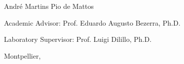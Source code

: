 \begin{titlepage}
    \vfill
    \vfill

    \begin{center}
        \large{André Martins Pio de Mattos}
    \end{center}

    \begin{center}
    
        Academic Advisor: Prof. Eduardo Augusto Bezerra, Ph.D.
        
        Laboratory Supervisor: Prof. Luigi Dilillo, Ph.D.
    
    \end{center}

    \vspace{1cm}

    \begin{center}
        Montpellier, \the\year
    \end{center}
\end{titlepage}
